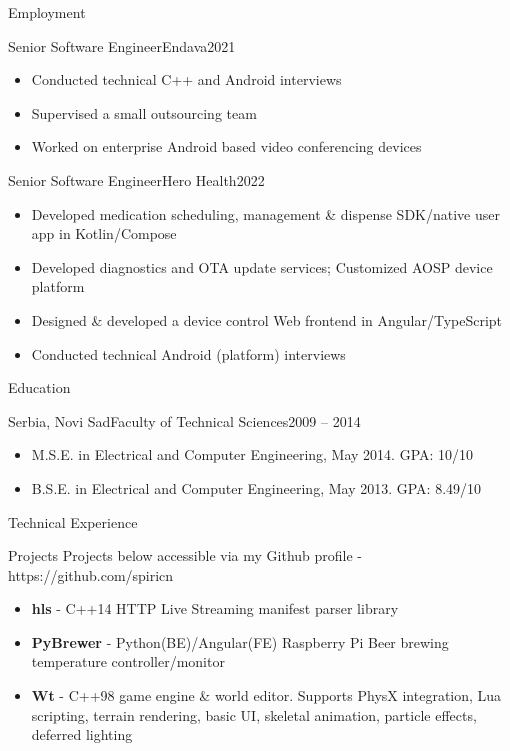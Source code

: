 \documentclass[]{mcdowellcv}
\begin{document}
\begin{cvsection}{Employment}
		\begin{cvsubsection}{Senior Software Engineer}{Endava}{2021}
			\begin{itemize}
				\item Conducted technical C++ and Android interviews
				\item Supervised a small outsourcing team
				\item Worked on enterprise Android based video conferencing devices
			\end{itemize}
		\end{cvsubsection}

		\begin{cvsubsection}{Senior Software Engineer}{Hero Health}{2022}
			\begin{itemize}
				\item Developed medication scheduling, management \& dispense SDK/native user app in Kotlin/Compose
				\item Developed diagnostics and OTA update services; Customized AOSP device platform
				\item Designed \& developed a device control Web frontend in Angular/TypeScript
				\item Conducted technical Android (platform) interviews
			\end{itemize}
		\end{cvsubsection}
	\end{cvsection}

	\begin{cvsection}{Education}
		\begin{cvsubsection}{Serbia, Novi Sad}{Faculty of Technical Sciences}{2009 -- 2014}
			\begin{itemize}
				\item M.S.E. in Electrical and Computer Engineering, May 2014. GPA: 10/10
				\item B.S.E. in Electrical and Computer Engineering, May 2013. GPA: 8.49/10
			\end{itemize}
		\end{cvsubsection}
	\end{cvsection}

	\begin{cvsection}{Technical Experience}
		\begin{cvsubsection}{Projects}{}{}
			Projects below accessible via my Github profile - https://github.com/spiricn
			\begin{itemize}
				\item \textbf{hls} - C++14 HTTP Live Streaming manifest parser library
				\item \textbf{PyBrewer} - Python(BE)/Angular(FE) Raspberry Pi Beer brewing temperature controller/monitor
				\item \textbf{Wt} - C++98 game engine \& world editor. Supports PhysX integration, Lua scripting, terrain rendering, basic UI, skeletal animation, particle effects, deferred lighting
			\end{itemize}
		\end{cvsubsection}
	\end{cvsection}
\end{document}
